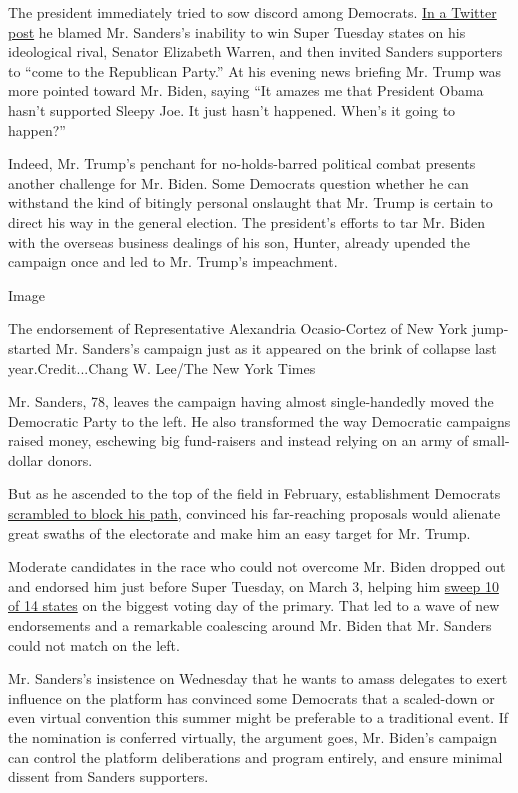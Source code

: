 The president immediately tried to sow discord among Democrats.
\href{https://twitter.com/realDonaldTrump/status/1247914464319504385}{In
a Twitter post} he blamed Mr. Sanders's inability to win Super Tuesday
states on his ideological rival, Senator Elizabeth Warren, and then
invited Sanders supporters to ``come to the Republican Party.'' At his
evening news briefing Mr. Trump was more pointed toward Mr. Biden,
saying ``It amazes me that President Obama hasn't supported Sleepy Joe.
It just hasn't happened. When's it going to happen?''

Indeed, Mr. Trump's penchant for no-holds-barred political combat
presents another challenge for Mr. Biden. Some Democrats question
whether he can withstand the kind of bitingly personal onslaught that
Mr. Trump is certain to direct his way in the general election. The
president's efforts to tar Mr. Biden with the overseas business dealings
of his son, Hunter, already upended the campaign once and led to Mr.
Trump's impeachment.

Image

The endorsement of Representative Alexandria Ocasio-Cortez of New York
jump-started Mr. Sanders's campaign just as it appeared on the brink of
collapse last year.Credit...Chang W. Lee/The New York Times

Mr. Sanders, 78, leaves the campaign having almost single-handedly moved
the Democratic Party to the left. He also transformed the way Democratic
campaigns raised money, eschewing big fund-raisers and instead relying
on an army of small-dollar donors.

But as he ascended to the top of the field in February, establishment
Democrats
\href{https://www.nytimes3xbfgragh.onion/2020/03/02/us/politics/bernie-sanders-democratic-party.html?searchResultPosition=1}{scrambled
to block his path}, convinced his far-reaching proposals would alienate
great swaths of the electorate and make him an easy target for Mr.
Trump.

Moderate candidates in the race who could not overcome Mr. Biden dropped
out and endorsed him just before Super Tuesday, on March 3, helping him
\href{https://www.nytimes3xbfgragh.onion/2020/03/03/us/politics/super-tuesday-primary-winners.html}{sweep
10 of 14 states} on the biggest voting day of the primary. That led to a
wave of new endorsements and a remarkable coalescing around Mr. Biden
that Mr. Sanders could not match on the left.

Mr. Sanders's insistence on Wednesday that he wants to amass delegates
to exert influence on the platform has convinced some Democrats that a
scaled-down or even virtual convention this summer might be preferable
to a traditional event. If the nomination is conferred virtually, the
argument goes, Mr. Biden's campaign can control the platform
deliberations and program entirely, and ensure minimal dissent from
Sanders supporters.


